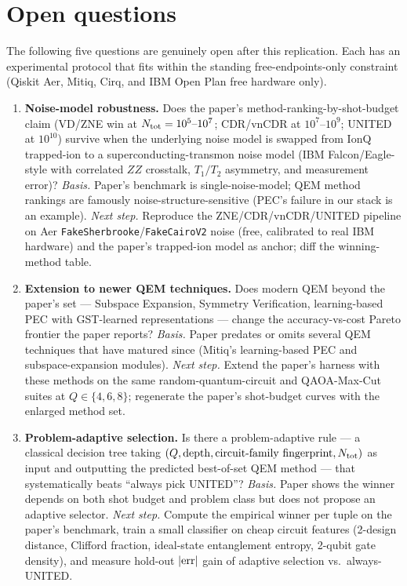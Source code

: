 \section{Open questions}

The following five questions are genuinely open after this replication.
Each has an experimental protocol that fits within the standing
free-endpoints-only constraint (Qiskit Aer, Mitiq, Cirq, and IBM Open
Plan free hardware only).

\begin{enumerate}
  \item \textbf{Noise-model robustness.}  Does the paper's
    method-ranking-by-shot-budget claim (VD/ZNE win at
    $N_{\rm tot}=10^5\text{--}10^7$; CDR/vnCDR at $10^7\text{--}10^9$;
    UNITED at $10^{10}$) survive when the underlying noise model is
    swapped from IonQ trapped-ion to a superconducting-transmon noise
    model (IBM Falcon/Eagle-style with correlated $ZZ$ crosstalk,
    $T_1/T_2$ asymmetry, and measurement error)?
    \emph{Basis.} Paper's benchmark is single-noise-model; QEM
    method rankings are famously noise-structure-sensitive
    (PEC's failure in our stack is an example).
    \emph{Next step.} Reproduce the ZNE/CDR/vnCDR/UNITED pipeline on
    Aer \texttt{FakeSherbrooke}/\texttt{FakeCairoV2} noise (free,
    calibrated to real IBM hardware) and the paper's trapped-ion
    model as anchor; diff the winning-method table.

  \item \textbf{Extension to newer QEM techniques.}  Does modern QEM
    beyond the paper's set --- Subspace Expansion, Symmetry
    Verification, learning-based PEC with GST-learned representations
    --- change the accuracy-vs-cost Pareto frontier the paper reports?
    \emph{Basis.} Paper predates or omits several QEM techniques that
    have matured since (Mitiq's learning-based PEC and
    subspace-expansion modules).
    \emph{Next step.} Extend the paper's harness with these methods on
    the same random-quantum-circuit and QAOA-Max-Cut suites at
    $Q\in\{4,6,8\}$; regenerate the paper's shot-budget curves with
    the enlarged method set.

  \item \textbf{Problem-adaptive selection.}  Is there a
    problem-adaptive rule --- a classical decision tree taking
    $(Q, {\rm depth}, {\rm circuit\text{-}family\ fingerprint},
    N_{\rm tot})$ as input and outputting the predicted best-of-set
    QEM method --- that systematically beats ``always pick UNITED''?
    \emph{Basis.} Paper shows the winner depends on both shot budget
    and problem class but does not propose an adaptive selector.
    \emph{Next step.} Compute the empirical winner per tuple on the
    paper's benchmark, train a small classifier on cheap circuit
    features (2-design distance, Clifford fraction, ideal-state
    entanglement entropy, 2-qubit gate density), and measure
    hold-out $|{\rm err}|$ gain of adaptive selection vs.\
    always-UNITED.


\end{enumerate}
